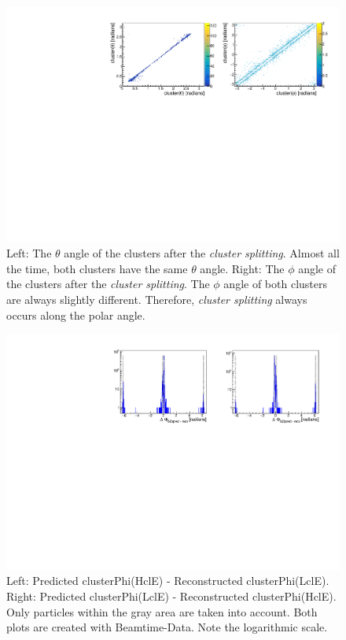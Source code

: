 \documentclass[a4paper,11pt,twosided,final,german,openbib,pdftex,listof=totoc,bibliography=totoc]{scrbook}
\begin{document}
\begin{appendix}
\begin{figure}[H]
	\centering
	\includegraphics[width=\textwidth]{AnhangPlots/ttpp.pdf}
	\caption[Cluster Splitting Angle Distribution]{Left: The $\theta$ angle of the clusters after the \textit{cluster splitting}. Almost all the time, both clusters have the same $\theta$ angle.  Right: The $\phi$ angle of the clusters after the \textit{cluster splitting}. The $\phi$ angle of both clusters are always slightly different. Therefore, \textit{cluster splitting} always occurs along the polar angle.}
	\label{fig:clusterSplittingAngle}
\end{figure}



\begin{figure}[h!]
	\centering
	\includegraphics[width=\textwidth]{Plots/sb2b_Data_0.pdf}
	\caption[b2bClusterPhi - clusterPhi For Data (Whole Range)]{Left: Predicted clusterPhi(HclE) - Reconstructed clusterPhi(LclE). Right: Predicted clusterPhi(LclE) - Reconstructed clusterPhi(HclE). Only particles within the gray area are taken into account. Both plots are created with Beamtime-Data. Note the logarithmic scale.}
	\label{fig:b2bData_Whole}
\end{figure}







\end{appendix}
\end{document}
